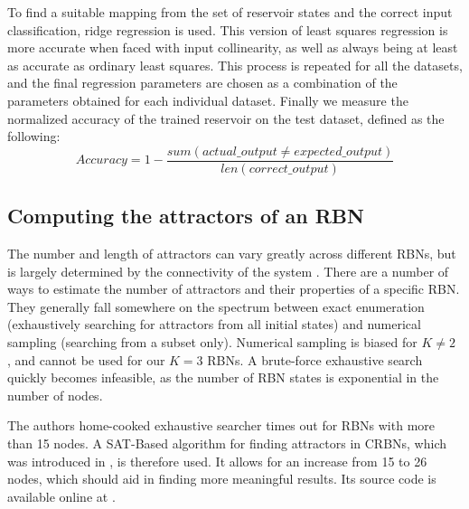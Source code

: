 To find a suitable mapping from the set of reservoir states and the correct input classification,
ridge regression \cite{hoerl1970ridge} is used.
This version of least squares regression is more accurate when faced with input collinearity, as well as always being at least as accurate as ordinary least squares.  
This process is repeated for all the datasets,
and the final regression parameters are chosen as a combination of the parameters obtained for each individual dataset.
Finally we measure the normalized accuracy of the trained reservoir on the test dataset,
defined as the following:
\begin{equation}
Accuracy = 1 - \dfrac{sum(actual\_output \neq expected\_output)}{len(correct\_output)}
\label{formula:accuracy}
\end{equation}

\subsection{Computing the attractors of an RBN}
\label{section:computing-attractors}

The number and length of attractors can vary greatly across different RBNs,
but is largely determined by the connectivity of the system \cite{gershenson2004introduction}.
There are a number of ways to estimate the number of attractors and their properties of a specific RBN.
They generally fall somewhere on the spectrum between exact enumeration (exhaustively searching for attractors from all initial states) and numerical sampling (searching from a subset only).
Numerical sampling is biased for $K\neq2$ \cite{berdahl2009random}, and cannot be used for our $K=3$ RBNs.
A brute-force exhaustive search quickly becomes infeasible, as the number of RBN states is exponential in the number of nodes.

The authors home-cooked exhaustive searcher times out for RBNs with more than 15 nodes.
A SAT-Based algorithm for finding attractors in CRBNs,
which was introduced in \cite{dubrova2011sat},
is therefore used.
It allows for an increase from 15 to 26 nodes,
which should aid in finding more meaningful results.
Its source code is available online at \cite{dubrova2011sat-online}.
